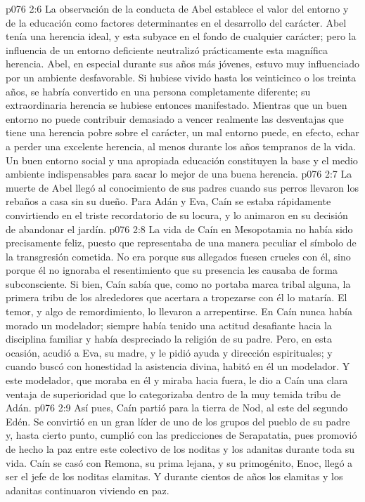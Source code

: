 \vs p076 2:6 \pc La observación de la conducta de Abel establece el valor del entorno y de la educación como factores determinantes en el desarrollo del carácter. Abel tenía una herencia ideal, y esta subyace en el fondo de cualquier carácter; pero la influencia de un entorno deficiente neutralizó prácticamente esta magnífica herencia. Abel, en especial durante sus años más jóvenes, estuvo muy influenciado por un ambiente desfavorable. Si hubiese vivido hasta los veinticinco o los treinta años, se habría convertido en una persona completamente diferente; su extraordinaria herencia se hubiese entonces manifestado. Mientras que un buen entorno no puede contribuir demasiado a vencer realmente las desventajas que tiene una herencia pobre sobre el carácter, un mal entorno puede, en efecto, echar a perder una excelente herencia, al menos durante los años tempranos de la vida. Un buen entorno social y una apropiada educación constituyen la base y el medio ambiente indispensables para sacar lo mejor de una buena herencia.
\vs p076 2:7 \pc La muerte de Abel llegó al conocimiento de sus padres cuando sus perros llevaron los rebaños a casa sin su dueño. Para Adán y Eva, Caín se estaba rápidamente convirtiendo en el triste recordatorio de su locura, y lo animaron en su decisión de abandonar el jardín.
\vs p076 2:8 La vida de Caín en Mesopotamia no había sido precisamente feliz, puesto que representaba de una manera peculiar el símbolo de la transgresión cometida. No era porque sus allegados fuesen crueles con él, sino porque él no ignoraba el resentimiento que su presencia les causaba de forma subconsciente. Si bien, Caín sabía que, como no portaba marca tribal alguna, la primera tribu de los alrededores que acertara a tropezarse con él lo mataría. El temor, y algo de remordimiento, lo llevaron a arrepentirse. En Caín nunca había morado un modelador; siempre había tenido una actitud desafiante hacia la disciplina familiar y había despreciado la religión de su padre. Pero, en esta ocasión, acudió a Eva, su madre, y le pidió ayuda y dirección espirituales; y cuando buscó con honestidad la asistencia divina, habitó en él un modelador. Y este modelador, que moraba en él y miraba hacia fuera, le dio a Caín una clara ventaja de superioridad que lo categorizaba dentro de la muy temida tribu de Adán.
\vs p076 2:9 Así pues, Caín partió para la tierra de Nod, al este del segundo Edén. Se convirtió en un gran líder de uno de los grupos del pueblo de su padre y, hasta cierto punto, cumplió con las predicciones de Serapatatia, pues promovió de hecho la paz entre este colectivo de los noditas y los adanitas durante toda su vida. Caín se casó con Remona, su prima lejana, y su primogénito, Enoc, llegó a ser el jefe de los noditas elamitas. Y durante cientos de años los elamitas y los adanitas continuaron viviendo en paz.
